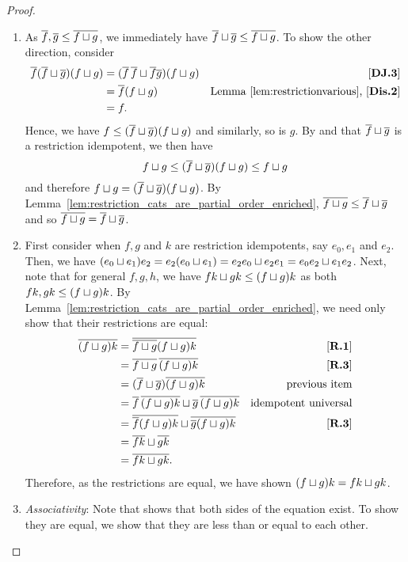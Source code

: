 \begin{proof}
  \prepprooflist
  \begin{enumerate}[{(}i{)}]
    \item As $\overline{f}, \overline{g} \le \overline{f\sqcup g}$, we immediately have
      $\overline{f} \sqcup \overline{g} \le \overline{f \sqcup g}$. To show the other direction, consider
      \begin{align*}
        \overline{f}(\overline{f} \sqcup \overline{g}) (f \sqcup g)
        &= (\overline{f}\,\overline{f} \sqcup \overline{f}\overline{g})(f \sqcup g) &\text{\ensuremath{[\text{\bfseries {DJ}.{3}}]}}\\
        &= \overline{f} (f\sqcup g) &\text{Lemma~\ref{lem:restrictionvarious}, \ensuremath{[\text{\bfseries {Dis}.{2}}]}}\\
        &= f.
      \end{align*}
      Hence, we have $f \le (\overline{f} \sqcup \overline{g}) (f \sqcup g)$ and similarly, so is $g$. By
       and that $\overline{f} \sqcup \overline{g}$ is a restriction idempotent, we then have
      \[
        f \sqcup g \le (\overline{f} \sqcup \overline{g}) (f \sqcup g) \le f \sqcup g
      \]
      and therefore $f \sqcup g = (\overline{f} \sqcup \overline{g}) (f \sqcup g)$. By
      Lemma~\ref{lem:restriction_cats_are_partial_order_enriched}, $\overline{f\sqcup g} \le \overline{f}
      \sqcup \overline{g}$ and so $\overline{f\sqcup g} = \overline{f}\sqcup \overline{g}$.
    \item First consider when $f, g$ and $k$ are restriction idempotents, say $e_0, e_1 $ and $e_2$.
      Then, we have $(e_0 \sqcup e_1)e_2 = e_2(e_0 \sqcup e_1) = e_2 e_0 \sqcup e_2 e_1 =
      e_0 e_2 \sqcup e_1 e_2$.
      Next, note that for general $f,g,h$, we have $f k \sqcup g k \le (f\sqcup g) k$ as both
      $f k, g k \le (f\sqcup g) k$.
      By Lemma~\ref{lem:restriction_cats_are_partial_order_enriched}, we need only show that their
      restrictions are equal:
      \begin{align*}
        \overline{(f\sqcup g)k} &= \overline{\overline{f\sqcup g}(f\sqcup g) k } & [\text{\bfseries {R}.{1}}] \\
        & = \overline{f\sqcup g}\, \overline{(f\sqcup g)k } & [\text{\bfseries {R}.{3}}]\\
        & = (\overline{f}\sqcup \overline{g}) \overline{(f\sqcup g)k }  & \text{previous item}\\
        & = \overline{f}\,\overline{(f\sqcup g)k } \sqcup \overline{g}\, \overline{(f\sqcup g)k }
          &\text{idempotent universal}\\
        & = \overline{\overline{f} (f\sqcup g)k} \sqcup \overline{\overline{g} (f\sqcup g)k} & [\text{\bfseries {R}.{3}}]\\
        & = \overline{f k} \sqcup \overline{g k}\\
        & = \overline{f k \sqcup g k}.
      \end{align*}
      Therefore, as the restrictions are equal, we have shown $(f\sqcup g)k = f k \sqcup g k$.
    \item \emph{Associativity}: Note that  shows that both sides of the equation
      exist. To show they are equal, we show that they are less than or equal to each other.


\end{enumerate}
\end{proof}

